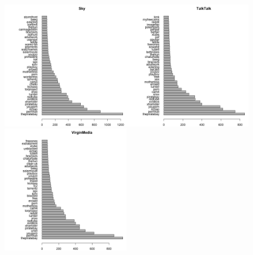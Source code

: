\documentclass{bmcart}
\begin{document}
\begin{figure}[h!]
\includegraphics[width=0.49\textwidth]{imgs/Sky-blocked-pages-to-date.png}\includegraphics[width=0.49\textwidth]{imgs/TalkTalk-blocked-pages-to-date}
\includegraphics[width=0.49\textwidth]{imgs/VirginMedia-blocked-pages-to-date}
\label{fig:broadband-blocked-domains}
\end{figure}
\end{document}
